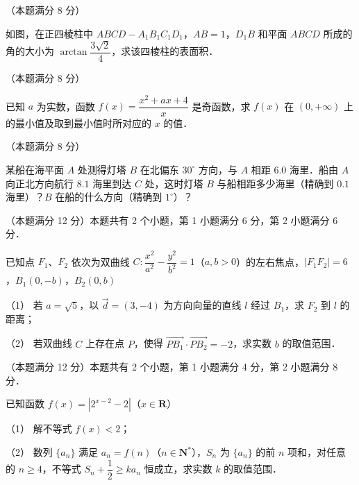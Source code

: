 \Needspace{0.4\textheight}
\begin{question}
（本题满分 8 分）

如图，在正四棱柱中 \(ABCD-A_{1}B_{1}C_{1}D_{1}\)，\(AB=1\)，\(D_{1}B\) 和平面 \(ABCD\) 所成的角的大小为 \(\arctan\dfrac{3\sqrt{2}}{4}\)，求该四棱柱的表面积．
\nopagebreak[4]
\begin{center}\end{center}
\nopagebreak[4]
\end{question}
\begin{question}
（本题满分 8 分）

已知 \(a\) 为实数，函数 \(f(x)=\dfrac{x^{2}+ax+4}{x}\) 是奇函数，求 \(f(x)\) 在 \((0,+\infty)\) 上的最小值及取到最小值时所对应的 \(x\) 的值．

\end{question}
\begin{question}
（本题满分 8 分）

某船在海平面 \(A\) 处测得灯塔 \(B\) 在北偏东 \(30^{\circ}\) 方向，与 \(A\) 相距 \(6.0\) 海里．船由 \(A\) 向正北方向航行 \(8.1\) 海里到达 \(C\) 处，这时灯塔 \(B\) 与船相距多少海里（精确到 \(0.1\) 海里）？\(B\) 在船的什么方向（精确到 \(1^{\circ}\)）？

\end{question}
\begin{question}
（本题满分 12 分）本题共有 2 个小题，第 1 小题满分 6 分，第 2 小题满分 6 分．

已知点 \(F_{1}\)、\(F_{2}\) 依次为双曲线 \(C:\dfrac{x^{2}}{a^{2}}-\dfrac{y^{2}}{b^{2}}=1\)（\(a,b>0\)）的左右焦点，\(|F_{1}F_{2}|=6\)，\(B_{1}(0,-b)\)，\(B_{2}(0,b)\)

（1） 若 \(a=\sqrt{5}\)，以 \(\vec{d}=(3,-4)\) 为方向向量的直线 \(l\) 经过 \(B_{1}\)，求 \(F_{2}\) 到 \(l\) 的距离；

（2） 若双曲线 \(C\) 上存在点 \(P\)，使得 \(\overrightarrow{PB_{1}}\cdot\overrightarrow{PB_{2}}=-2\)，求实数 \(b\) 的取值范围．

\end{question}
\begin{question}
（本题满分 12 分）本题共有 2 个小题，第 1 小题满分 4 分，第 2 小题满分 8 分．

已知函数 \(f(x)=\left|2^{x-2}-2\right|\)（\(x\in\mathbf{R}\)）

（1） 解不等式 \(f(x)<2\)；

（2） 数列 \(\{a_{n}\}\) 满足 \(a_{n}=f(n)\)（\(n\in\mathbf{N}^{*}\)），\(S_{n}\) 为 \(\{a_{n}\}\) 的前 \(n\) 项和，对任意的 \(n\geqslant 4\)，不等式 \(S_{n}+\dfrac{1}{2}\geqslant ka_{n}\) 恒成立，求实数 \(k\) 的取值范围．

\end{question}

